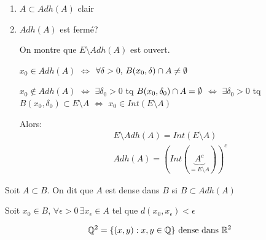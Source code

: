 \begin{preuve}
   \begin{enumerate}
       \item $A \subset Adh(A)$ clair
       \item $Adh(A)$ est fermé?
           \par On montre que  $E \setminus Adh(A)$ est ouvert. \par 
           $x_0 \in Adh(A)$ $\iff$ $\forall \delta > 0, \, B(x_0, \delta) \cap A \neq \emptyset$ \par
           $x_0 \not\in Adh(A)$ $\iff$ $\exists \delta_0 > 0$ tq $B(x_0, \delta_0) \cap A = \emptyset$ $\iff$ $\exists \delta_0>0$ tq $B(x_0, \delta_0) \subset E\setminus A$ $\iff$ $x_0 \in Int(E\setminus A)$ 
           \par Alors:
           \begin{align*}
               &E \setminus Adh(A) = Int(E \setminus A)\\
               &Adh(A) = (Int(\underbrace{A^{c}}_{= E \setminus A}))^{c}
           \end{align*}
   \end{enumerate} 
\end{preuve}
\begin{definition}
    Soit $A \subset B$. On dit que $A$ est dense dans  $B$ si  $B \subset Adh(A)$
    \par
    Soit $x_0 \in B, \, \forall \epsilon > 0 \, \exists  x_{\epsilon} \in A$ tel que $d(x_0, x_{\epsilon}) < \epsilon$
\end{definition}
\begin{eg}
   \[
       \mathbb{Q}^2 = \{(x, y): x,y \in \mathbb{Q}\} \text{ dense dans } \mathbb{R}^2
   \]  
   
\end{eg}

